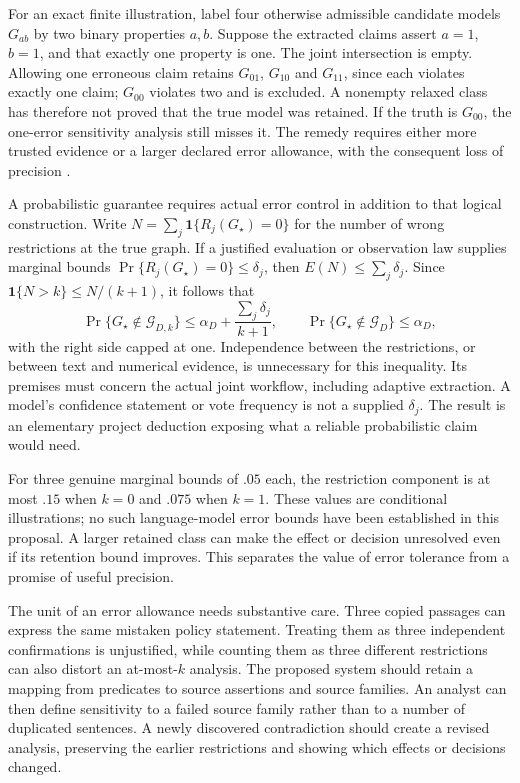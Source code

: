 For an exact finite illustration, label four otherwise admissible candidate
models $G_{ab}$ by two binary properties $a,b$. Suppose the extracted claims
assert $a=1$, $b=1$, and that exactly one property is one. The joint
intersection is empty. Allowing one erroneous claim retains $G_{01}$,
$G_{10}$ and $G_{11}$, since each violates exactly one claim; $G_{00}$
violates two and is excluded. A nonempty relaxed class has therefore not
proved that the true model was retained. If the truth is $G_{00}$, the
one-error sensitivity analysis still misses it. The remedy requires either
more trusted evidence or a larger declared error allowance, with the
consequent loss of precision \citep{exec14_discovery_design_oracles}.

A probabilistic guarantee requires actual error control in addition to that
logical construction. Write $N=\sum_j\mathbf1\{R_j(G_\star)=0\}$ for
the number of wrong restrictions at the true graph. If a justified evaluation
or observation law supplies marginal bounds
$\Pr\{R_j(G_\star)=0\}\leq\delta_j$, then
$E(N)\leq\sum_j\delta_j$. Since
$\mathbf1\{N>k\}\leq N/(k+1)$, it follows that
\[
 \Pr\{G_\star\notin\mathcal G_{D,k}\}
 \leq \alpha_D+\frac{\sum_j\delta_j}{k+1},
 \qquad
 \Pr\{G_\star\notin\mathcal G_D\}\leq\alpha_D,
\]
with the right side capped at one. Independence between the restrictions,
or between text and numerical evidence, is unnecessary for this inequality.
Its premises must concern the actual joint workflow, including adaptive
extraction. A model's confidence statement or vote frequency is not a
supplied $\delta_j$. The result is an elementary project deduction exposing
what a reliable probabilistic claim would need.

For three genuine marginal bounds of $.05$ each, the restriction component
is at most $.15$ when $k=0$ and $.075$ when $k=1$. These values are conditional
illustrations; no such language-model error bounds have been established in
this proposal. A larger retained class can make the effect or decision
unresolved even if its retention bound improves. This separates the value of
error tolerance from a promise of useful precision.

The unit of an error allowance needs substantive care. Three copied passages
can express the same mistaken policy statement. Treating them as three
independent confirmations is unjustified, while counting them as three
different restrictions can also distort an at-most-$k$ analysis. The proposed
system should retain a mapping from predicates to source assertions and
source families. An analyst can then define sensitivity to a failed source
family rather than to a number of duplicated sentences. A newly discovered
contradiction should create a revised analysis, preserving the earlier
restrictions and showing which effects or decisions changed.

